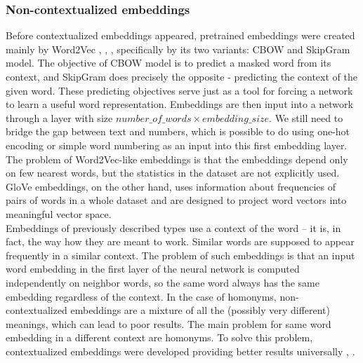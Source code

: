 \subsubsection{Non-contextualized embeddings}
Before contextualized embeddings appeared, pretrained embeddings were created mainly by Word2Vec \citep{Mikolov2013}, \citep{Turian2010}, \citep{Pennington}, specifically by its two variants: CBOW and SkipGram model.
The objective of CBOW model is to predict a masked word from its context, and SkipGram does precisely the opposite - predicting the context of the given word. These predicting objectives serve just as a tool for forcing a network to learn a useful word representation. Embeddings are then input into a network through a layer with size $number\_of\_words \times embedding\_size$. We still need to bridge the gap between text and numbers, which is possible to do using one-hot encoding or simple word numbering as an input into this first embedding layer.  The problem of Word2Vec-like embeddings is that the embeddings depend only on few nearest words, but the statistics in the dataset are not explicitly used. GloVe \citep{Pennington} embeddings, on the other hand, uses information about frequencies of pairs of words in a whole dataset and are designed to project word vectors into meaningful vector space. 
\\
Embeddings of previously described types use a  context of the word -- it is, in fact, the way how they are meant to work. Similar words are supposed to appear frequently in a similar context. The problem of such embeddings is that an input word embedding in the first layer of the neural network is computed independently on neighbor words, so the same word always has the same embedding regardless of the context. In the case of homonyms, non-contextualized embeddings are a mixture of all the (possibly very different) meanings, which can lead to poor results. %
The main problem for same word embedding in a different context are homonyms. To solve this problem, contextualized embeddings were developed providing better results universally \citep{Straka2019a}, \citep{Liu2020}.

